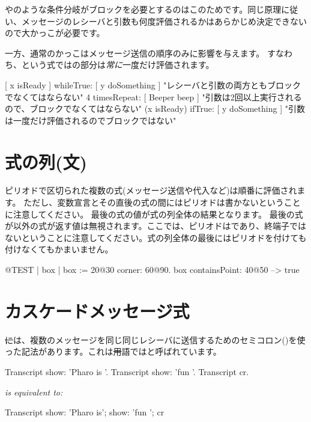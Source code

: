 \documentclass[a4paper,10pt,twoside]{book}
\begin{document}
やのような条件分岐がブロックを必要とするのはこのためです。同じ原理に従い、メッセージのレシーバと引数も何度評価されるかはあらかじめ決定できないので大かっこが必要です。

一方、通常のかっこはメッセージ送信の順序のみに影響を与えます。
すなわち、という式ではの部分は\emph{常に}一度だけ評価されます。

\begin{code}{}
[ x isReady ] whileTrue: [ y doSomething ]   "レシーバと引数の両方ともブロックでなくてはならない"
4 timesRepeat: [ Beeper beep ]                   "引数は2回以上実行されるので、ブロックでなくてはならない"
(x isReady) ifTrue: [ y doSomething ]           "引数は一度だけ評価されるのでブロックではない"
\end{code}

\section{式の列(文)}
ピリオドで区切られた複数の式(\ie メッセージ送信や代入など)は順番に評価されます。
ただし、変数宣言とその直後の式の間にはピリオドは書かないということに注意してください。
最後の式の値が式の列全体の結果となります。
最後の式が以外の式が返す値は無視されます。ここでは、ピリオドはであり、終端子ではないということに注意してください。式の列全体の最後にはピリオドを付けても付けなくてもかまいません。

\begin{code}{@TEST}
| box |
box := 20@30 corner: 60@90.
box containsPoint: 40@50 --> true
\end{code}

\section{カスケードメッセージ式}
\st には、複数のメッセージを同じ同じレシーバに送信するためのセミコロン(\ct{;})を使った記法があります。これは\st 用語ではと呼ばれています。


\begin{minipage}{0.35\textwidth}
\begin{code}{}
Transcript show: 'Pharo is '.
Transcript show: 'fun '.
Transcript cr.
\end{code}
\end{minipage}
\emph{is equivalent to:}
\begin{minipage}{0.35\textwidth}
\begin{code}{}
Transcript        
   show: 'Pharo is';
   show: 'fun ';
   cr
\end{code}
\end{minipage}
\end{document}
